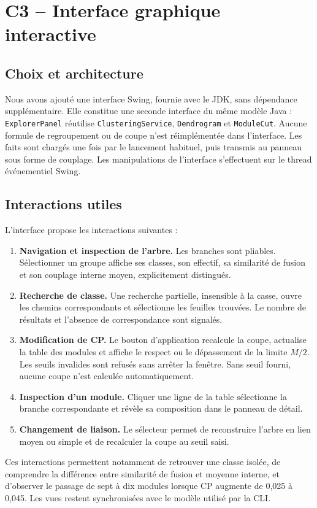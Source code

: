 \documentclass[11pt,a4paper]{article}
\begin{document}
\section{C3 -- Interface graphique interactive}
\subsection{Choix et architecture}
Nous avons ajouté une interface Swing, fournie avec le JDK, sans dépendance
supplémentaire. Elle constitue une seconde interface du même modèle Java :
\texttt{ExplorerPanel} réutilise \texttt{ClusteringService}, \texttt{Dendrogram}
et \texttt{ModuleCut}. Aucune formule de regroupement ou de coupe n'est
réimplémentée dans l'interface. Les faits sont chargés une fois par le lancement
habituel, puis transmis au panneau sous forme de couplage. Les manipulations
de l'interface s'effectuent sur le thread événementiel Swing.

\subsection{Interactions utiles}
L'interface propose les interactions suivantes :
\begin{enumerate}
\item \textbf{Navigation et inspection de l'arbre.} Les branches sont pliables.
Sélectionner un groupe affiche ses classes, son effectif, sa similarité de
fusion et son couplage interne moyen, explicitement distingués.
\item \textbf{Recherche de classe.} Une recherche partielle, insensible à la
casse, ouvre les chemins correspondants et sélectionne les feuilles trouvées.
Le nombre de résultats et l'absence de correspondance sont signalés.
\item \textbf{Modification de CP.} Le bouton d'application recalcule la coupe,
actualise la table des modules et affiche le respect ou le dépassement de
la limite $M/2$. Les seuils invalides sont refusés sans arrêter la fenêtre.
Sans seuil fourni, aucune coupe n'est calculée automatiquement.
\item \textbf{Inspection d'un module.} Cliquer une ligne de la table sélectionne
la branche correspondante et révèle sa composition dans le panneau de détail.
\item \textbf{Changement de liaison.} Le sélecteur permet de reconstruire
l'arbre en lien moyen ou simple et de recalculer la coupe au seuil saisi.
\end{enumerate}
Ces interactions permettent notamment de retrouver une classe isolée, de
comprendre la différence entre similarité de fusion et moyenne interne, et
d'observer le passage de sept à dix modules lorsque CP augmente de 0,025 à
0,045. Les vues restent synchronisées avec le modèle utilisé par la CLI.
\end{document}
